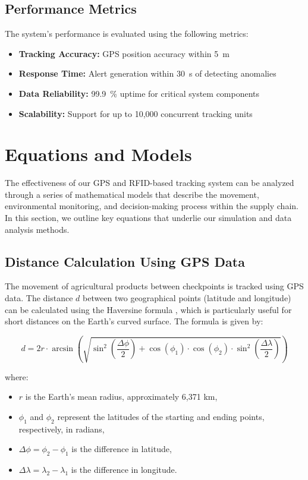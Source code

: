 \documentclass[conference]{IEEEtran}
\begin{document}
\subsection{Performance Metrics}
The system's performance is evaluated using the following metrics:
\begin{itemize}
    \item \textbf{Tracking Accuracy:} GPS position accuracy within \SI{5}{\meter}
    \item \textbf{Response Time:} Alert generation within \SI{30}{\second} of detecting anomalies
    \item \textbf{Data Reliability:} \SI{99.9}{\percent} uptime for critical system components
    \item \textbf{Scalability:} Support for up to 10,000 concurrent tracking units
\end{itemize}

\section{Equations and Models}

The effectiveness of our GPS and RFID-based tracking system can be analyzed through a series of mathematical models that describe the movement, environmental monitoring, and decision-making process within the supply chain. In this section, we outline key equations that underlie our simulation and data analysis methods.

\subsection{Distance Calculation Using GPS Data}

The movement of agricultural products between checkpoints is tracked using GPS data. The distance \( d \) between two geographical points (latitude and longitude) can be calculated using the Haversine formula \cite{xu2023novel}, which is particularly useful for short distances on the Earth's curved surface. The formula is given by:

\begin{equation}
    d = 2r \cdot \arcsin \left( \sqrt{\sin^2 \left( \frac{\Delta \phi}{2} \right) + \cos(\phi_1) \cdot \cos(\phi_2) \cdot \sin^2 \left( \frac{\Delta \lambda}{2} \right)} \right)
\end{equation}

where:
\begin{itemize}
    \item \( r \) is the Earth's mean radius, approximately 6,371 km,
    \item \( \phi_1 \) and \( \phi_2 \) represent the latitudes of the starting and ending points, respectively, in radians,
    \item \( \Delta \phi = \phi_2 - \phi_1 \) is the difference in latitude,
    \item \( \Delta \lambda = \lambda_2 - \lambda_1 \) is the difference in longitude.
\end{itemize}
\end{document}
